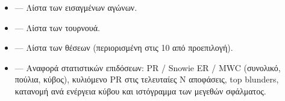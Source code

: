 \documentclass[letterpaper,10pt,greek]{sphinxmanual}
\begin{document}
\sphinxAtStartPar
{}
\begin{itemize}
\item {} 
\sphinxAtStartPar
{} — Λίστα των εισαγμένων αγώνων.

\item {} 
\sphinxAtStartPar
{} — Λίστα των τουρνουά.

\item {} 
\sphinxAtStartPar
{} — Λίστα των θέσεων (περιορισμένη στις 10 από προεπιλογή).

\item {} 
\sphinxAtStartPar
{} — Αναφορά στατιστικών επιδόσεων: PR / Snowie ER / MWC (συνολικό, πούλια, κύβος), κυλιόμενο PR στις τελευταίες N αποφάσεις, top blunders, κατανομή ανά ενέργεια κύβου και ιστόγραμμα των μεγεθών σφάλματος.

\end{itemize}
\end{document}
